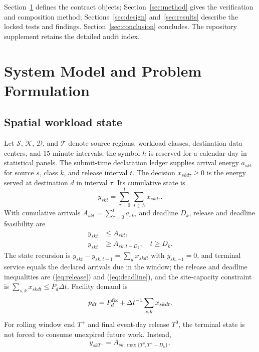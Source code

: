 \documentclass[10pt,journal]{IEEEtran}
\newcommand{\dt}{\Delta t}
\begin{document}
Section~\ref{sec:model} defines the contract objects;
Section~\ref{sec:method} gives the verification and composition method;
Sections~\ref{sec:design} and~\ref{sec:results} describe the locked tests and
findings. Section~\ref{sec:conclusion} concludes. The repository supplement retains
the detailed audit index.

\section{System Model and Problem Formulation}\label{sec:model}

\subsection{Spatial workload state}

Let $\mathcal S$, $\mathcal K$, $\mathcal D$, and $\mathcal T$ denote source
regions, workload classes, destination data centers, and 15-minute intervals;
the symbol $h$ is reserved for a calendar day in statistical panels.
The submit-time declaration ledger supplies arrival energy $a_{skt}$ for source
$s$, class $k$, and release interval $t$. The decision $x_{skd\tau}\geq0$ is the energy
served at destination $d$ in interval $\tau$. Its cumulative state is
\begin{equation}
 y_{skt}=\sum_{\tau=0}^{t}\sum_{d\in\mathcal D}x_{skd\tau}.
 \label{eq:cumulative}
\end{equation}
With cumulative arrivals $A_{skt}=\sum_{\tau=0}^{t}a_{sk\tau}$ and deadline
$D_k$, release and deadline feasibility are
\begin{align}
 y_{skt}&\leq A_{skt}, \label{eq:release}\\
 y_{skt}&\geq A_{sk,t-D_k},\quad t\geq D_k. \label{eq:deadline}
\end{align}
The state recursion is $y_{skt}-y_{sk,t-1}=\sum_d x_{skdt}$ with
$y_{sk,-1}=0$, and terminal service equals the declared arrivals due in the
window; the release and deadline inequalities are (\ref{eq:release}) and
(\ref{eq:deadline}), and the site-capacity constraint is
$\sum_{s,k}x_{skdt}\leq\bar P_d\dt$. Facility demand is
\begin{equation}
 p_{dt}=P_d^{\rm fix}+\dt^{-1}\sum_{s,k}x_{skdt}.
 \label{eq:power}
\end{equation}
For rolling window end $T^+$ and final event-day release $T^0$, the terminal
state is not forced to consume unexpired future work. Instead,
\begin{equation}
y_{skT^+}=A_{sk,\max\{T^0,T^+-D_k\}},
\label{eq:rollingterminal}
\end{equation}
\end{document}
